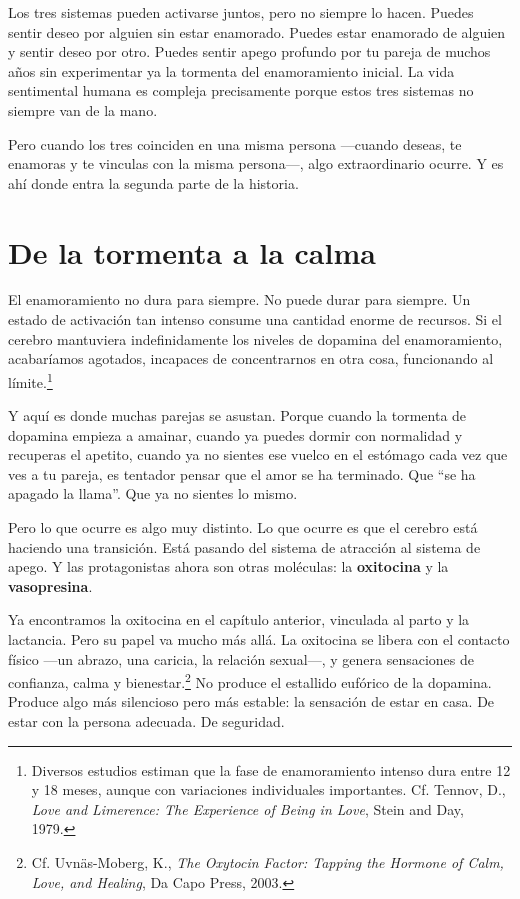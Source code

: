 Los tres sistemas pueden activarse juntos, pero no siempre lo hacen. Puedes sentir deseo por alguien sin estar enamorado. Puedes estar enamorado de alguien y sentir deseo por otro. Puedes sentir apego profundo por tu pareja de muchos años sin experimentar ya la tormenta del enamoramiento inicial. La vida sentimental humana es compleja precisamente porque estos tres sistemas no siempre van de la mano.

Pero cuando los tres coinciden en una misma persona ---cuando deseas, te enamoras y te vinculas con la misma persona---, algo extraordinario ocurre. Y es ahí donde entra la segunda parte de la historia.

\section{De la tormenta a la calma}

El enamoramiento no dura para siempre. No puede durar para siempre. Un estado de activación tan intenso consume una cantidad enorme de recursos. Si el cerebro mantuviera indefinidamente los niveles de dopamina del enamoramiento, acabaríamos agotados, incapaces de concentrarnos en otra cosa, funcionando al límite.\footnote{Diversos estudios estiman que la fase de enamoramiento intenso dura entre 12 y 18 meses, aunque con variaciones individuales importantes. Cf. Tennov, D., \textit{Love and Limerence: The Experience of Being in Love}, Stein and Day, 1979.}

Y aquí es donde muchas parejas se asustan. Porque cuando la tormenta de dopamina empieza a amainar, cuando ya puedes dormir con normalidad y recuperas el apetito, cuando ya no sientes ese vuelco en el estómago cada vez que ves a tu pareja, es tentador pensar que el amor se ha terminado. Que ``se ha apagado la llama''. Que ya no sientes lo mismo.

Pero lo que ocurre es algo muy distinto. Lo que ocurre es que el cerebro está haciendo una transición. Está pasando del sistema de atracción al sistema de apego. Y las protagonistas ahora son otras moléculas: la \textbf{oxitocina} y la \textbf{vasopresina}.

Ya encontramos la oxitocina en el capítulo anterior, vinculada al parto y la lactancia. Pero su papel va mucho más allá. La oxitocina se libera con el contacto físico ---un abrazo, una caricia, la relación sexual---, y genera sensaciones de confianza, calma y bienestar.\footnote{Cf. Uvnäs-Moberg, K., \textit{The Oxytocin Factor: Tapping the Hormone of Calm, Love, and Healing}, Da Capo Press, 2003.} No produce el estallido eufórico de la dopamina. Produce algo más silencioso pero más estable: la sensación de estar en casa. De estar con la persona adecuada. De seguridad.

